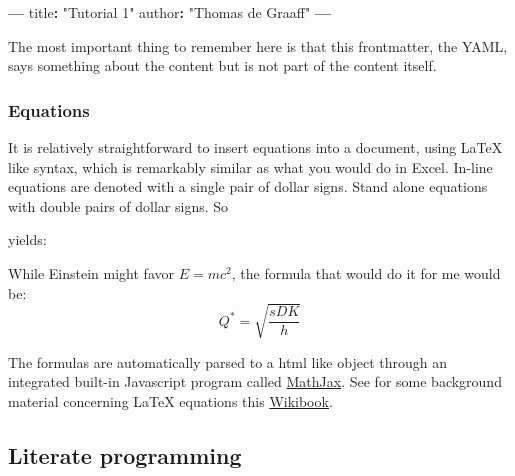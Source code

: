 \documentclass[]{article}
\newenvironment{Shaded}{\begin{snugshade}}{\end{snugshade}}
\newcommand{\DecValTok}[1]{\textcolor[rgb]{0.00,0.00,0.81}{#1}}
\newcommand{\StringTok}[1]{\textcolor[rgb]{0.31,0.60,0.02}{#1}}
\newcommand{\ControlFlowTok}[1]{\textcolor[rgb]{0.13,0.29,0.53}{\textbf{#1}}}
\newcommand{\OperatorTok}[1]{\textcolor[rgb]{0.81,0.36,0.00}{\textbf{#1}}}
\newcommand{\ErrorTok}[1]{\textcolor[rgb]{0.64,0.00,0.00}{\textbf{#1}}}
\newcommand{\NormalTok}[1]{#1}
\theoremstyle{definition}
\theoremstyle{definition}
\theoremstyle{definition}
\theoremstyle{remark}
\begin{document}
\begin{Shaded}
\begin{Highlighting}[]
\OperatorTok{---}
\NormalTok{title}\OperatorTok{:}\StringTok{ "Tutorial 1"}
\NormalTok{author}\OperatorTok{:}\StringTok{ "Thomas de Graaff"}
\OperatorTok{---}
\end{Highlighting}
\end{Shaded}

The most important thing to remember here is that this frontmatter, the
YAML, says something about the content but is not part of the content
itself.

\subsubsection{Equations}\label{equations}

It is relatively straightforward to insert equations into a document,
using LaTeX like syntax, which is remarkably similar as what you would
do in Excel. In-line equations are denoted with a single pair of dollar
signs. Stand alone equations with double pairs of dollar signs. So

\begin{Shaded}
\end{Shaded}

yields:

While Einstein might favor \(E = mc^2\), the formula that would do it
for me would be: \[ Q^\ast = \sqrt{\frac{sDK}{h}}\]

The formulas are automatically parsed to a html like object through an
integrated built-in Javascript program called
\href{https://www.mathjax.org/}{MathJax}. See for some background
material concerning LaTeX equations this
\href{https://en.wikibooks.org/wiki/LaTeX/Mathematics}{Wikibook}.

\subsection{Literate programming}\label{literate-programming}
\end{document}
